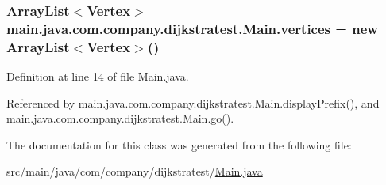 \hypertarget{classmain_1_1java_1_1com_1_1company_1_1dijkstratest_1_1_main_a9e9e1529522bffb58584b4f319e07217}{
\subsubsection[{vertices}]{\setlength{\rightskip}{0pt plus 5cm}Array\-List$<${\bf Vertex}$>$ main.\-java.\-com.\-company.\-dijkstratest.\-Main.\-vertices = new Array\-List$<${\bf Vertex}$>$()\hspace{0.3cm}{\ttfamily [private]}}}\label{classmain_1_1java_1_1com_1_1company_1_1dijkstratest_1_1_main_a9e9e1529522bffb58584b4f319e07217}


Definition at line 14 of file Main.\-java.



Referenced by main.\-java.\-com.\-company.\-dijkstratest.\-Main.\-display\-Prefix(), and main.\-java.\-com.\-company.\-dijkstratest.\-Main.\-go().



The documentation for this class was generated from the following file\-:\begin{DoxyCompactItemize}
\item 
src/main/java/com/company/dijkstratest/\hyperlink{_main_8java}{Main.\-java}\end{DoxyCompactItemize}
